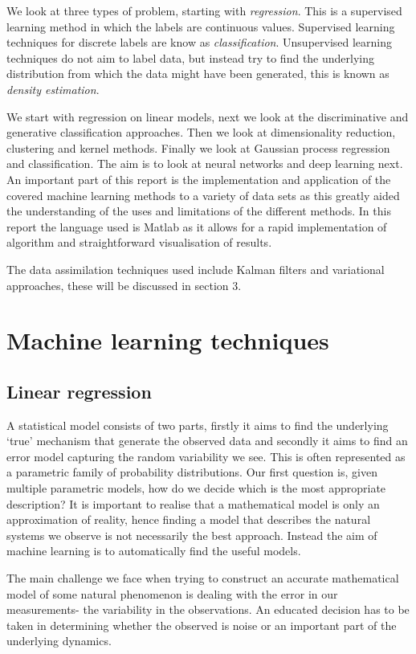 \documentclass[english]{article}
\begin{document}
We look at three types of problem, starting with \textit{regression}. This is a supervised learning method in which the labels are continuous values.
Supervised learning techniques for discrete labels are know as \textit{classification}.
Unsupervised learning techniques do not aim to label data, but instead try to find the underlying distribution from which the data might have been generated, this is known as \textit{density estimation}.

We start with regression on linear models, next we look at the discriminative and generative classification approaches. Then we look at dimensionality reduction, clustering and kernel methods. Finally we look at Gaussian process regression and classification. The aim is to look at neural networks and deep learning next. An important part of this report is the implementation and application of the covered machine learning methods to a variety of data sets as this greatly aided the understanding of the uses and limitations of the different methods. In this report the language used is Matlab as it allows for a rapid implementation of algorithm and straightforward visualisation of results.
\vspace{0.5cm}

\noindent The data assimilation techniques used include Kalman filters and variational approaches, these will be discussed in section 3.
\section{Machine learning techniques}
\subsection{Linear regression}
A statistical model consists of two parts, firstly it aims to find the underlying `true' mechanism that generate the observed data and secondly it aims to find an error model capturing the random variability we see. This is often represented as a parametric family of probability distributions. Our first question is, given multiple parametric models, how do we decide which is the most appropriate description? It is important to realise that a mathematical model is only an approximation of reality, hence finding a model that describes the natural systems we observe is not necessarily the best approach. Instead the aim of machine learning is to automatically find the useful models.

The main challenge we face when trying to construct an accurate mathematical model of some natural phenomenon is dealing with the error in our measurements- the variability in the observations. An educated decision has to be taken in determining whether the observed is noise or an important part of the underlying dynamics. 
\end{document}
